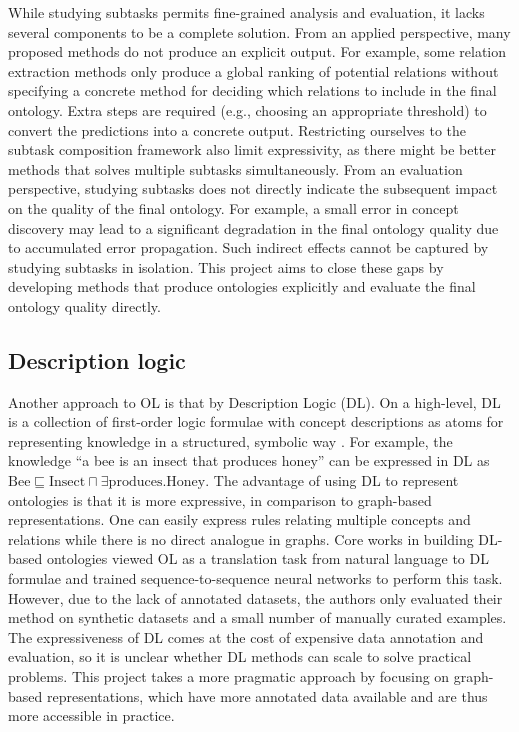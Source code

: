 While studying subtasks permits fine-grained analysis and evaluation, it lacks several components to be a complete solution. From an applied perspective, many proposed methods do not produce an explicit output. For example, some relation extraction methods only produce a global ranking of potential relations \cite{roller2018hearst} without specifying a concrete method for deciding which relations to include in the final ontology. Extra steps are required (e.g., choosing an appropriate threshold) to convert the predictions into a concrete output. Restricting ourselves to the subtask composition framework also limit expressivity, as there might be better methods that solves multiple subtasks simultaneously. From an evaluation perspective, studying subtasks does not directly indicate the subsequent impact on the quality of the final ontology. For example, a small error in concept discovery may lead to a significant degradation in the final ontology quality due to accumulated error propagation. Such indirect effects cannot be captured by studying subtasks in isolation. This project aims to close these gaps by developing methods that produce ontologies explicitly and evaluate the final ontology quality directly.

\subsection{Description logic}

Another approach to OL is that by Description Logic (DL). On a high-level, DL is a collection of first-order logic formulae with concept descriptions as atoms for representing knowledge in a structured, symbolic way \cite{baader2017introduction}. For example, the knowledge ``a bee is an insect that produces honey'' can be expressed in DL as
    {
        \sffamily
        $\text{Bee} \sqsubseteq \text{Insect} \sqcap  \exists \text{produces}. \text{Honey}.$
    }
The advantage of using DL to represent ontologies is that it is more expressive, in comparison to graph-based representations. One can easily express rules relating multiple concepts and relations while there is no direct analogue in graphs. Core works in building DL-based ontologies viewed OL as a translation task from natural language to DL formulae \cite{petrucci2016ontology,petrucci2018expressive} and trained sequence-to-sequence neural networks to perform this task. However, due to the lack of annotated datasets, the authors only evaluated their method on synthetic datasets and a small number of manually curated examples. The expressiveness of DL comes at the cost of expensive data annotation and evaluation, so it is unclear whether DL methods can scale to solve practical problems. This project takes a more pragmatic approach by focusing on graph-based representations, which have more annotated data available and are thus more accessible in practice.

